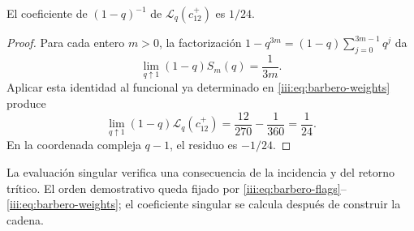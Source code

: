 \begin{proposition}
\label{iii:prop:barbero-pole}
El coeficiente de $(1-q)^{-1}$ de
$\mathscr L_q(c_{12}^{+})$ es $1/24$.
\end{proposition}
\begin{proof}
Para cada entero $m>0$, la factorización
$1-q^{3m}=(1-q)\sum_{j=0}^{3m-1}q^j$ da
\[
 \lim_{q\uparrow1}(1-q)S_m(q)=\frac1{3m}.
\]
Aplicar esta identidad al funcional ya determinado en
\eqref{iii:eq:barbero-weights} produce
\begin{equation}
 \lim_{q\uparrow1}(1-q)\mathscr L_q(c_{12}^{+})
 =\frac{12}{270}-\frac1{360}=\frac1{24}.
 \label{iii:eq:barbero-pole}
\end{equation}
En la coordenada compleja $q-1$, el residuo es $-1/24$.
\end{proof}

La evaluación singular verifica una consecuencia de la incidencia y del
retorno trítico. El orden demostrativo queda fijado por
\eqref{iii:eq:barbero-flags}--\eqref{iii:eq:barbero-weights}; el
coeficiente singular se calcula después de construir la cadena.

